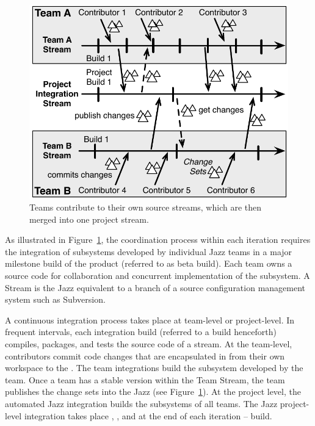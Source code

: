\begin{figure}[t]
\begin{center}
\includegraphics[width=\columnwidth]{figures/BuildResult}
\caption{Teams contribute to their own source streams, which are then merged into one project stream.}
\label{fig:BuildResult}
\end{center}
\end{figure}


As illustrated in Figure~\ref{fig:BuildResult}, the coordination process within
each iteration requires the integration of subsystems developed by individual
Jazz teams in a major milestone build of the product (referred to as beta build).
Each team owns a source code  for collaboration and concurrent
implementation of the subsystem. A Stream is the Jazz equivalent to a branch of a
source configuration management system such as Subversion.

A continuous integration process takes place at team-level or project-level. In
frequent intervals, each integration build (referred to a build henceforth)
compiles, packages, and tests the source code of a stream. At the team-level,
contributors commit code changes that are encapsulated in  from
their own workspace to the . The team integrations build the
subsystem developed by the team. Once a team has a stable version within the Team
Stream, the team publishes the change sets into the Jazz  (see Figure~\ref{fig:BuildResult}). At the project level, the automated
Jazz integration builds the subsystems of all teams. The Jazz project-level
integration takes place , , and at the end of each
iteration --  build.

